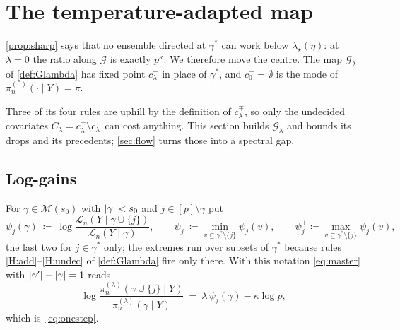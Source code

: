 \documentclass[aos]{imsart}
\DeclarePairedDelimiter{\abs}{\lvert}{\rvert}
\theoremstyle{plain}
\theoremstyle{definition}
\begin{document}


    \section{The temperature-adapted map}
    \label{sec:alltemp}

    \cref{prop:sharp} says that no ensemble directed at $\gamma^{\ast}$ can
    work below $\lambda_\star(\eta)$: at $\lambda=0$ the ratio along
    $\mathcal{G}$ is exactly $p^{\kappa}$. We therefore move the centre. The
    map $\mathcal{G}_\lambda$ of \cref{def:Glambda} has fixed point
    $c^{-}_\lambda$ in place of $\gamma^{\ast}$, and $c^{-}_0=\emptyset$ is
    the mode of $\pi_n^{(0)}(\cdot\mid Y)=\pi$.

    Three of its four rules are uphill by the definition of
    $c^{\mp}_\lambda$, so only the undecided covariates
    $C_\lambda=c^{+}_\lambda\setminus c^{-}_\lambda$ can cost anything. This
    section builds $\mathcal{G}_\lambda$ and bounds its drops and its
    precedents; \cref{sec:flow} turns those into a spectral gap.

    \subsection{Log-gains}
    \label{sub:psi}

    For $\gamma\in\mathscr{M}(s_0)$ with $\abs\gamma<s_0$ and
    $j\in[p]\setminus\gamma$ put
    \begin{equation}
        \label{eq:psidef}
        \psi_j(\gamma)\ \coloneq\
        \log\frac{\mathcal{L}_n(Y\mid\gamma\cup\{j\})}
        {\mathcal{L}_n(Y\mid\gamma)},
        \qquad
        \psi_j^{-}\coloneq\min_{v\subseteq\gamma^{\ast}\setminus\{j\}}
        \psi_j(v),
        \qquad
        \psi_j^{+}\coloneq\max_{v\subseteq\gamma^{\ast}\setminus\{j\}}
        \psi_j(v),
    \end{equation}
    the last two for $j\in\gamma^{\ast}$ only; the extremes run over subsets
    of $\gamma^{\ast}$ because rules \ref{H:add}--\ref{H:undec} of
    \cref{def:Glambda} fire only there. With this notation \eqref{eq:master} with
    $\abs{\gamma'}-\abs{\gamma}=1$ reads
    \begin{equation}
        \label{eq:onestepG}
        \log\frac{\pi_n^{(\lambda)}(\gamma\cup\{j\}\mid Y)}
        {\pi_n^{(\lambda)}(\gamma\mid Y)}
        \ =\ \lambda\,\psi_j(\gamma)-\kappa\log p ,
    \end{equation}
    which is~\eqref{eq:onestep}.
\end{document}
